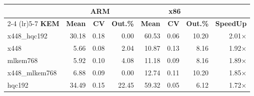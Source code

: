 \begin{table}[!ht]
\begin{tabular}{lrrr|rrr|r}
 \toprule
& \multicolumn{3}{c}{\bfseries ARM} & \multicolumn{3}{c}{\bfseries x86} &\\
\cmidrule(lr){2-4} \cmidrule(lr){5-7}
\textbf{KEM} & \textbf{Mean} & \textbf{CV} & \textbf{Out.\%} & \textbf{Mean} & \textbf{CV} & \textbf{Out.\%} & \textbf{SpeedUp}\\
\midrule
x448_hqc192 & 30.18 & 0.18 & 0.00 & 60.53 & 0.06 & 10.20 & 2.01× \\
x448 & 5.66 & 0.08 & 2.04 & 10.87 & 0.13 & 8.16 & 1.92× \\
mlkem768 & 5.92 & 0.10 & 4.08 & 11.18 & 0.09 & 8.16 & 1.89× \\
x448_mlkem768 & 6.88 & 0.09 & 0.00 & 12.74 & 0.11 & 10.20 & 1.85× \\
hqc192 & 34.49 & 0.15 & 22.45 & 59.32 & 0.05 & 6.12 & 1.72× \\
\bottomrule
\end{tabular}
\end{table}

